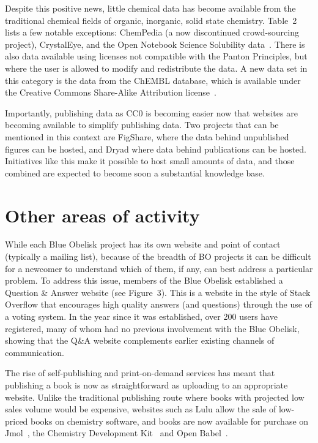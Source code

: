\documentclass[10pt]{bmc_article}
\newenvironment{bmcformat}{\fussy\setboolean{publ}{true}}{\fussy}
\begin{document}
\begin{bmcformat}
Despite this positive news, little chemical data has become
available from the traditional chemical fields of organic,
inorganic, solid state chemistry. Table~2 lists a few notable
exceptions: ChemPedia (a now discontinued crowd-sourcing project),
CrystalEye,\cite{WebCrystalEye}
and the Open Notebook Science Solubility
data~\cite{ONS2010}. There is also data available using licenses
not compatible with the Panton Principles, but where the user
is allowed to modify and redistribute the data. A new data
set in this category is the data from the ChEMBL database,
which is available under the Creative Commons Share-Alike
Attribution license~\cite{Overington2009}.

Importantly, publishing data as CC0 is becoming easier now that
websites are becoming available to simplify publishing data. Two
projects that can be mentioned in this context are
FigShare\cite{WebFigShare}, where the data behind unpublished figures
can be hosted, and Dryad\cite{WebDryad} where data behind publications
can be hosted. Initiatives like this make it possible to host small
amounts of data, and those combined are expected to become soon a
substantial knowledge base. 

\section*{Other areas of activity}

While each Blue Obelisk project has its own website and point of
contact (typically a mailing list), because of the breadth of BO
projects it can be difficult for a newcomer to understand which of
them, if any, can best address a particular problem. To address this
issue, members of the Blue Obelisk established a Question \& Answer
website\cite{WebBOShapado} (see Figure~3).  This is a website in the
style of Stack Overflow\cite{WebStackOverflow} that encourages high quality answers (and
questions) through the use of a voting system. In the year since it
was established, over 200 users have registered, many of whom had no
previous involvement with the Blue Obelisk, showing that the Q\&A
website complements earlier existing channels of communication.

The rise of self-publishing and print-on-demand services has meant
that publishing a book is now as straightforward as uploading to an
appropriate website. Unlike the traditional publishing route where
books with projected low sales volume would be expensive,
websites such as Lulu\cite{WebLulu} allow the sale of low-priced books on
chemistry software, and books are now available for purchase
on Jmol~\cite{JmolBook}, the Chemistry Development Kit~\cite{CDKBook}
and Open Babel~\cite{OpenBabelBook}.


\end{bmcformat}
\end{document}
